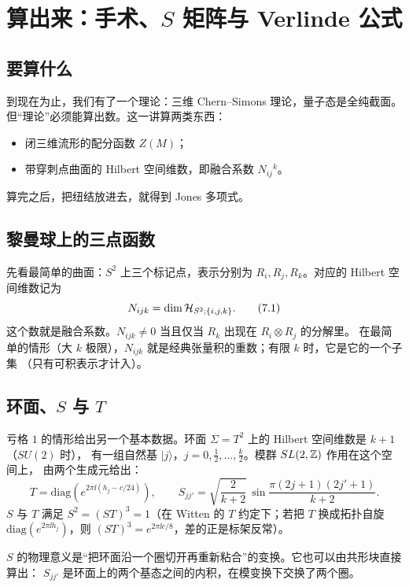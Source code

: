 \section{算出来：手术、$S$ 矩阵与 Verlinde 公式}

\subsection{要算什么}

到现在为止，我们有了一个理论：三维 Chern--Simons 理论，量子态是全纯截面。
但“理论”必须能算出数。这一讲算两类东西：
\begin{itemize}[leftmargin=*]
  \item 闭三维流形的配分函数 $Z(M)$；
  \item 带穿刺点曲面的 Hilbert 空间维数，即融合系数 $N_{ij}{}^k$。
\end{itemize}
算完之后，把纽结放进去，就得到 Jones 多项式。

\subsection{黎曼球上的三点函数}

先看最简单的曲面：$S^2$ 上三个标记点，表示分别为 $R_i,R_j,R_k$。对应的 Hilbert 空间维数记为
\begin{equation}
N_{ijk}=\dim\mathcal{H}_{S^2;\{i,j,k\}}. \tag{7.1}
\end{equation}
这个数就是融合系数。$N_{ijk}\ne0$ 当且仅当 $R_k$ 出现在 $R_i\otimes R_j$ 的分解里。
在最简单的情形（大 $k$ 极限），$N_{ijk}$ 就是经典张量积的重数；有限 $k$ 时，它是它的一个子集
（只有可积表示才计入）。

\subsection{环面、$S$ 与 $T$}

亏格 $1$ 的情形给出另一个基本数据。环面 $\Sigma=T^2$ 上的 Hilbert 空间维数是 $k+1$（$SU(2)$ 时），
有一组自然基 $|j\rangle$，$j=0,\frac12,\dots,\frac k2$。模群 $SL(2,\mathbb{Z})$ 作用在这个空间上，
由两个生成元给出：
\begin{equation}
T=\mathrm{diag}\left(e^{2\pi\ii(h_j-c/24)}\right),\qquad
S_{jj'}=\sqrt{\frac{2}{k+2}}\,\sin\frac{\pi(2j+1)(2j'+1)}{k+2}. \tag{7.2}
\end{equation}
$S$ 与 $T$ 满足 $S^2=(ST)^3=1$（在 Witten 的 $T$ 约定下；若把 $T$ 换成拓扑自旋
$\mathrm{diag}(e^{2\pi\ii h_j})$，则 $(ST)^3=e^{2\pi\ii c/8}$，差的正是标架反常）。

$S$ 的物理意义是“把环面沿一个圈切开再重新粘合”的变换。它也可以由共形块直接算出：
$S_{jj'}$ 是环面上的两个基态之间的内积，在模变换下交换了两个圈。

